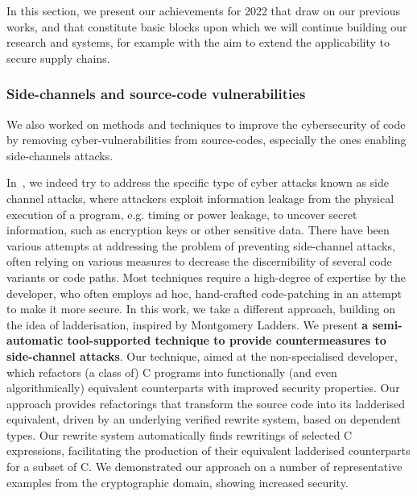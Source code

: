 
In this section, we present our achievements for 2022 that draw on our previous works, and that constitute basic blocks upon which we will continue building our research and systems, for example with the aim to extend the applicability to secure supply chains.

       

\subsubsection{Side-channels and source-code vulnerabilities}

We also worked on methods and techniques to improve the cybersecurity of code by removing cyber-vulnerabilities from source-codes, especially the ones enabling side-channels attacks.

In~\cite{brown:hal-03805561}, we indeed try to address the specific type of cyber attacks known as side channel attacks, where attackers exploit information leakage from the physical execution of a program, e.g. timing or power leakage, to uncover secret information, such as encryption keys or other sensitive data. There have been various attempts at addressing the problem of preventing side-channel attacks, often relying on various measures to decrease the discernibility of several code variants or code paths. Most techniques require a high-degree of expertise by the developer, who often employs ad hoc, hand-crafted code-patching in an attempt to make it more secure. In this work, we take a different approach, building on the idea of ladderisation, inspired by Montgomery Ladders. We present \textbf{a semi-automatic tool-supported technique to provide countermeasures to side-channel attacks}. Our technique, aimed at the non-specialised developer, which refactors (a class of) C programs into functionally (and even algorithmically) equivalent counterparts with improved security properties. Our approach provides refactorings that transform the source code into its ladderised equivalent, driven by an underlying verified rewrite system, based on dependent types. Our rewrite system automatically finds rewritings of selected C expressions, facilitating the production of their equivalent ladderised counterparts for a subset of C. We demonstrated our approach on a number of representative examples from the cryptographic domain, showing increased security. 

